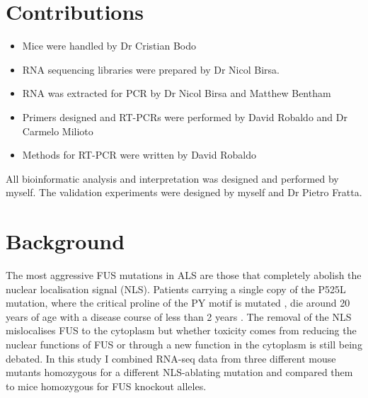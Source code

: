 \section{Contributions}
\begin{itemize}
	\item Mice were handled by Dr Cristian Bodo
	\item RNA sequencing libraries were prepared by Dr Nicol Birsa.
	\item RNA was extracted for PCR by Dr Nicol Birsa and Matthew Bentham
	\item Primers designed and RT-PCRs were performed by David Robaldo and Dr Carmelo Milioto
	\item Methods for RT-PCR were written by David Robaldo
\end{itemize}
All bioinformatic analysis and interpretation was designed and performed by myself.  
The validation experiments were designed by myself and Dr Pietro Fratta.

\clearpage
\section{Background}

The most aggressive FUS mutations in ALS are those that completely abolish the nuclear localisation signal (NLS). 
Patients carrying a single copy of the P525L mutation, where the critical proline of the PY motif is mutated \citep{Chio2009}, die around 20 years of age with a disease course of less than 2 years \citep{Shang2016}.
The removal of the NLS mislocalises FUS to the cytoplasm but whether toxicity comes from reducing the nuclear functions of FUS or through a new function in the cytoplasm is still being debated.
In this study I combined RNA-seq data from three different mouse mutants homozygous for a different NLS-ablating mutation and compared them to mice homozygous for FUS knockout alleles. 

